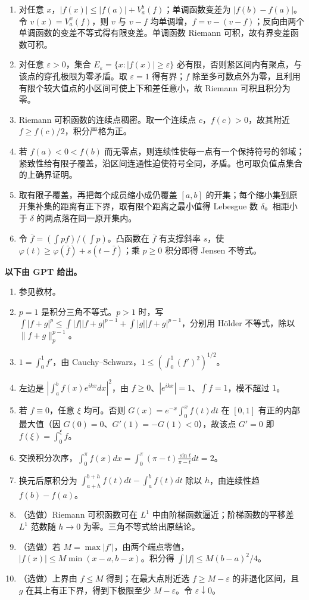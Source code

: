 \begin{enumerate}
\item 对任意 $x$，$|f(x)|\le |f(a)|+V_a^b(f)$；单调函数变差为 $|f(b)-f(a)|$。令 $v(x)=V_a^x(f)$，则 $v$ 与 $v-f$ 均单调增，$f=v-(v-f)$；反向由两个单调函数的变差不等式得有限变差。单调函数 Riemann 可积，故有界变差函数可积。
\item 对任意 $\varepsilon>0$，集合 $E_\varepsilon=\{x:|f(x)|\ge\varepsilon\}$ 必有限，否则紧区间内有聚点，与该点的穿孔极限为零矛盾。取 $\varepsilon=1$ 得有界；$f$ 除至多可数点外为零，且利用有限个较大值点的小区间可使上下和差任意小，故 Riemann 可积且积分为零。
\item Riemann 可积函数的连续点稠密。取一个连续点 $c$，$f(c)>0$，故其附近 $f\ge f(c)/2$，积分严格为正。
\item 若 $f(a)<0<f(b)$ 而无零点，则连续性使每一点有一个保持符号的邻域；紧致性给有限子覆盖，沿区间连通性迫使符号全同，矛盾。也可取负值点集合的上确界证明。
\item 取有限子覆盖，再把每个成员缩小成仍覆盖 $[a,b]$ 的开集；每个缩小集到原开集补集的距离有正下界，取有限个距离之最小值得 Lebesgue 数 $\delta$。相距小于 $\delta$ 的两点落在同一原开集内。
\item 令 $\bar f=(\int pf)/(\int p)$。凸函数在 $\bar f$ 有支撑斜率 $s$，使 $\varphi(t)\ge\varphi(\bar f)+s(t-\bar f)$；乘 $p\ge0$ 积分即得 Jensen 不等式。
\end{enumerate}
\noindent\textbf{以下由 GPT 给出。}
\begin{enumerate}
\item 参见教材。
\item $p=1$ 是积分三角不等式。$p>1$ 时，写 $\int|f+g|^p\le\int|f||f+g|^{p-1}+\int|g||f+g|^{p-1}$，分别用 H\"older 不等式，除以 $\lVert{}f+g\rVert_p^{p-1}$。
\item $1=\int_0^1f'$，由 Cauchy--Schwarz，$1\le(\int_0^1(f')^2)^{1/2}$。
\item 左边是 $|\int_a^b f(x)e^{ikx}dx|^2$，由 $f\ge0$、$|e^{ikx}|=1$、$\int f=1$，模不超过 $1$。
\item 若 $f\equiv0$，任意 $\xi$ 均可。否则 $G(x)=e^{-x}\int_0^xf(t)dt$ 在 $[0,1]$ 有正的内部最大值（因 $G(0)=0$、$G'(1)=-G(1)<0$），故该点 $G'=0$ 即 $f(\xi)=\int_0^\xi f$。
\item 交换积分次序，$\int_0^\pi f(x)dx=\int_0^\pi(\pi-t)\frac{\sin t}{\pi-t}dt=2$。
\item 换元后原积分为 $\int_{a+h}^{b+h}f(t)dt-\int_a^bf(t)dt$ 除以 $h$，由连续性趋 $f(b)-f(a)$。
\item（选做）Riemann 可积函数可在 $L^1$ 中由阶梯函数逼近；阶梯函数的平移差 $L^1$ 范数随 $h\to0$ 为零。三角不等式给出原结论。
\item（选做）若 $M=\max|f'|$，由两个端点零值，$|f(x)|\le M\min(x-a,b-x)$。积分得 $\int|f|\le M(b-a)^2/4$。
\item（选做）上界由 $f\le M$ 得到；在最大点附近选 $f\ge M-\varepsilon$ 的非退化区间，且 $g$ 在其上有正下界，得到下极限至少 $M-\varepsilon$。令 $\varepsilon\downarrow0$。
\end{enumerate}
